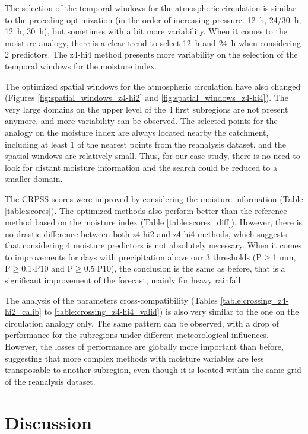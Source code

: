 \documentclass[5p]{elsarticle}
\begin{document}
The selection of the temporal windows for the atmospheric circulation is similar to the preceding optimization (in the order of increasing pressure: 12~h, 24/30~h, 12~h, 30~h), but sometimes with a bit more variability. When it comes to the moisture analogy, there is a clear trend to select 12~h and 24~h when considering 2 predictors. The z4-hi4 method presents more variability on the selection of the temporal windows for the moisture index.

The optimized spatial windows for the atmospheric circulation have also changed (Figures \ref{fig:spatial_windows_z4-hi2} and \ref{fig:spatial_windows_z4-hi4}). The very large domains on the upper level of the 4 first subregions are not present anymore, and more variability can be observed. The selected points for the analogy on the moisture index are always located nearby the catchment, including at least 1 of the nearest points from the reanalysis dataset, and the spatial windows are relatively small. Thus, for our case study, there is no need to look for distant moisture information and the search could be reduced to a smaller domain. 

The CRPSS scores were improved by considering the moisture information (Table \ref{table:scores}). The optimized methods also perform better than the reference method based on the moisture index (Table \ref{table:scores_diff}). However, there is no drastic difference between both z4-hi2 and z4-hi4 methods, which suggests that considering 4 moisture predictors is not absolutely necessary. When it comes to improvements for days with precipitation above our 3 thresholds (P\(\geq\)1 mm, P\(\geq\)0.1\(\cdot\)P10 and P\(\geq\)0.5\(\cdot\)P10), the conclusion is the same as before, that is a significant improvement of the forecast, mainly for heavy rainfall.

The analysis of the parameters cross-compatibility (Tables \ref{table:crossing_z4-hi2_calib} to \ref{table:crossing_z4-hi4_valid}) is also very similar to the one on the circulation analogy only. The same pattern can be observed, with a drop of performance for the subregions under different meteorological influences. However, the losses of performance are globally more important than before, suggesting that more complex methods with moisture variables are less transposable to another subregion, even though it is located within the same grid of the reanalysis dataset.


\section{Discussion}
\end{document}
